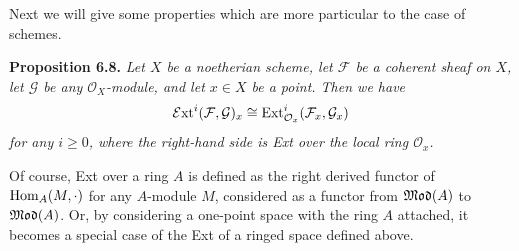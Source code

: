 {\smallskip
Next we will give some properties which are more particular to the case of schemes.

\medskip
\noindent\hypertarget{result-III-6.8}{}\textbf{Proposition 6.8.} \emph{Let $X$ be a noetherian scheme, let $\mathcal F$ be a coherent sheaf on $X$, let $\mathcal G$ be any $\mathcal O_X$-module, and let $x\in X$ be a point. Then we have}
\[
\operatorname{\mathcal E xt}^i(\mathcal F,\mathcal G)_x\cong\operatorname{Ext}^i_{\mathcal O_x}(\mathcal F_x,\mathcal G_x)
\]
\noindent\emph{for any $i\ge0$, where the right-hand side is Ext over the local ring $\mathcal O_x$.}

\Proof Of course, Ext over a ring $A$ is defined as the right derived functor of $\operatorname{Hom}_A(M,\cdot)$ for any $A$-module $M$, considered as a functor from $\operatorname{\mathfrak{Mod}}(A)$ to $\operatorname{\mathfrak{Mod}}(A)$. Or, by considering a one-point space with the ring $A$ attached, it becomes a special case of the Ext of a ringed space defined above.
}
